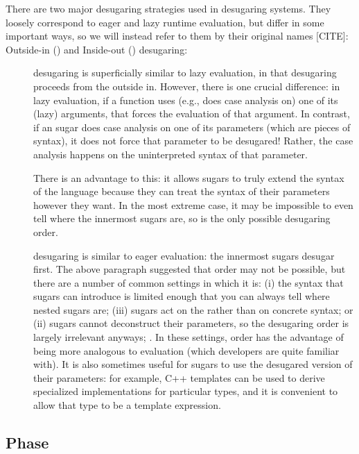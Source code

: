There are two major desugaring strategies used in desugaring systems.
They loosely correspond to eager and lazy runtime evaluation, but
differ in some important ways, so we will instead refer
to them by their original names [CITE]: Outside-in () and
Inside-out () desugaring:
\begin{description}
\item[] desugaring is superficially similar to lazy
  evaluation, in that desugaring proceeds from the outside in.
  However, there is one crucial difference: in lazy evaluation, if a
  function uses (e.g., does case analysis on) one of its (lazy)
  arguments, that forces the evaluation of that argument. In contrast,
  if an  sugar does case analysis on one of its
  parameters (which are pieces of syntax), it does not force that
  parameter to be desugared! Rather, the case analysis happens on the
  uninterpreted syntax of that parameter.

  There is an advantage to this: it allows sugars to truly extend the
  syntax of the language because they can treat the syntax of their
  parameters however they want.
  In the most extreme case, it may be impossible
  to even tell where the innermost sugars are, so  is the only
  possible desugaring order.
\item[] desugaring is similar to eager evaluation: the
  innermost sugars desugar first. The above paragraph suggested that
   order may not be possible, but there are a number of common
  settings in which it is: (i) the syntax that sugars can introduce is
  limited enough that you can always tell where nested sugars are;
  (iii) sugars act on the  rather than on concrete syntax; or
  (ii) sugars cannot deconstruct their parameters, so the desugaring
  order is largely irrelevant anyways; . In these settings, 
  order has the advantage of being more analogous to evaluation (which
  developers are quite familiar with). It is
  also sometimes useful for sugars to use the desugared version of
  their parameters: for example, C++ templates can be used to derive
  specialized implementations for particular types, and it is
  convenient to allow that type to be a template expression.
\end{description}


\subsection{Phase}

